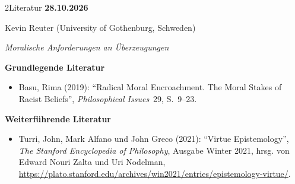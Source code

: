 \documentclass[xcolor=table,9pt,aspectratio=169]{beamer}
\begin{document}
\begin{frame}{\vspace*{10mm}2\hspace*{1em}Literatur}
\textbf{28.10.2026}

\smallskip
Kevin Reuter (University of Gothenburg, Schweden)

\medskip
\textit{Moralische Anforderungen an Überzeugungen}


\medskip
\textbf{Grundlegende Literatur}
{\footnotesize
\begin{itemize}[label=,leftmargin=2em,itemindent=-2em]
   \item Basu, Rima (2019): \enquote{Radical Moral Encroachment. The Moral Stakes of Racist Beliefs}, \textit{Philosophical Issues}~29, S.~9--23.
\end{itemize}
}

\medskip
\textbf{Weiterführende Literatur}
{\footnotesize
\begin{itemize}[label=,leftmargin=2em,itemindent=-2em]
   \item Turri, John, Mark Alfano und John Greco (2021): \enquote{Virtue Epistemology}, \textit{The Stanford Encyclopedia of Philosophy}, Ausgabe Winter 2021, hrsg. von Edward Nouri Zalta und Uri Nodelman, \url{https://plato.stanford.edu/archives/win2021/entries/epistemology-virtue/}.
\end{itemize}
}
\end{frame}
\end{document}
